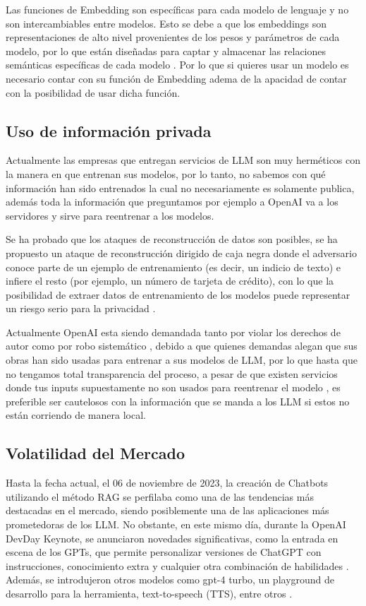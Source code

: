 Las funciones de Embedding son específicas para cada modelo de lenguaje y no son intercambiables entre modelos. Esto se debe a que los embeddings son 
representaciones de alto nivel provenientes de los pesos y parámetros de cada modelo, por lo que están diseñadas para captar y almacenar las relaciones 
semánticas específicas de cada modelo \cite{microsoft1}. Por lo que si quieres usar un modelo es necesario contar con su función de Embedding adema de la 
apacidad de contar con la posibilidad de usar dicha función. 


\subsection{Uso de información privada}

Actualmente las empresas que entregan servicios de LLM son muy herméticos con la manera en que entrenan sus modelos, por lo tanto, no sabemos 
con qué información han sido entrenados la cual no necesariamente es solamente publica, además toda la información que preguntamos por ejemplo a 
OpenAI va a los servidores y sirve para reentrenar a los modelos.

Se ha probado que los ataques de reconstrucción de datos son posibles, se ha propuesto un ataque de reconstrucción dirigido de caja negra donde el 
adversario conoce parte de un ejemplo de entrenamiento (es decir, un indicio de texto) e infiere el resto (por ejemplo, un número de tarjeta de crédito), 
con lo que la posibilidad de extraer datos de entrenamiento de los modelos puede representar un riesgo serio para la privacidad \cite{privacidad1}. 

Actualmente OpenAI esta siendo demandada tanto por violar los derechos de autor \cite{privacidad3} como por robo sistemático \cite{privacidad2}, debido a que quienes 
demandas alegan que sus obras han sido usadas para entrenar a sus modelos de LLM, por lo que hasta que no tengamos total transparencia del proceso, 
a pesar de que existen servicios donde tus inputs supuestamente no son usados para reentrenar el modelo \cite{openai4}, es preferible ser cautelosos con la 
información que se manda a los LLM si estos no están corriendo de manera local.

\subsection{Volatilidad del Mercado}

Hasta la fecha actual, el 06 de noviembre de 2023, la creación de Chatbots utilizando el método RAG se perfilaba como 
una de las tendencias más destacadas en el mercado, siendo posiblemente una de las aplicaciones más prometedoras de los LLM. 
No obstante, en este mismo día, durante la OpenAI DevDay Keynote, se anunciaron novedades significativas, como la entrada en 
escena de los GPTs, que permite personalizar versiones de ChatGPT con instrucciones, conocimiento extra y cualquier otra combinación 
de habilidades \cite{openai2}. Además, se introdujeron otros modelos como gpt-4 turbo, un playground de desarrollo para la herramienta, 
text-to-speech (TTS), entre otros \cite{openai3}.

